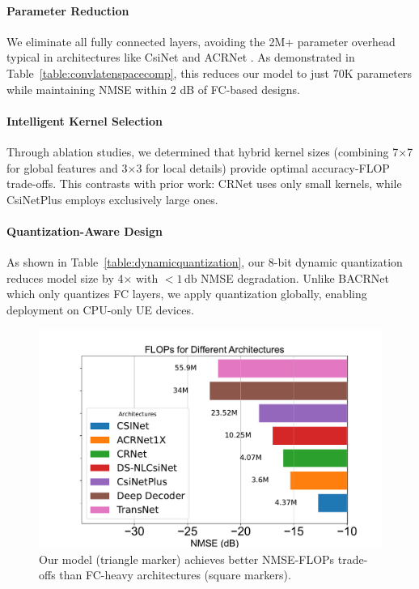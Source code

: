\documentclass[lettersize,journal]{IEEEtran}
\begin{document}
\paragraph{Parameter Reduction} 
We eliminate all fully connected layers, avoiding the 2M+ parameter overhead typical in architectures like CsiNet \cite{abe} and ACRNet \cite{abx}. As demonstrated in Table~\ref{table:convlatenspacecomp}, this reduces our model to just 70K parameters while maintaining NMSE within 2 dB of FC-based designs.

\paragraph{Intelligent Kernel Selection} 
Through ablation studies, we determined that hybrid kernel sizes (combining 7×7 for global features and 3×3 for local details) provide optimal accuracy-FLOP trade-offs. This contrasts with prior work: CRNet \cite{abn} uses only small kernels, while CsiNetPlus \cite{abo} employs exclusively large ones.

\paragraph{Quantization-Aware Design} 
As shown in Table~\ref{table:dynamicquantization}, our 8-bit dynamic quantization reduces model size by 4× with $< 1\,\text{db} $ NMSE degradation. Unlike BACRNet \cite{abx} which only quantizes FC layers, we apply quantization globally, enabling deployment on CPU-only UE devices.

\begin{figure}[t]
    \centering
    \includegraphics[width=\linewidth]{NMSEvsFLOPs.pdf}
    \caption{Our model (triangle marker) achieves better NMSE-FLOPs trade-offs than FC-heavy architectures (square markers).}
    \label{fig:efficiency-tradeoff}
\end{figure}
\end{document}
